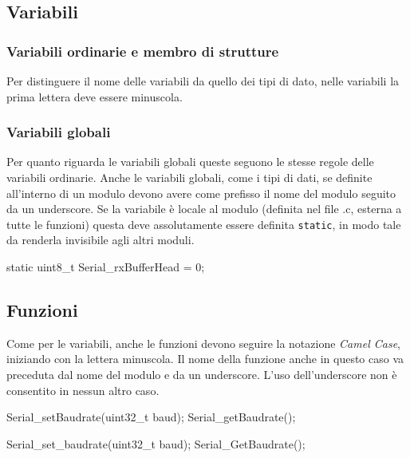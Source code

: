\subsection{Variabili}\label{ssec:evariable}

\subsubsection{Variabili ordinarie e membro di strutture}\label{sssec:evarnorm}

Per distinguere il nome delle variabili da quello dei tipi di dato, nelle variabili la prima lettera deve essere minuscola.

\subsubsection{Variabili globali}

Per quanto riguarda le variabili globali queste seguono le stesse regole delle variabili ordinarie.
Anche le variabili globali, come i tipi di dati, se definite all'interno di un modulo devono avere come prefisso il nome del modulo seguito da un underscore.
Se la variabile è locale al modulo (definita nel file .c, esterna a tutte le funzioni) questa deve assolutamente essere definita \texttt{static}, in modo tale da renderla invisibile agli altri moduli.

\noindent\begin{minipage}[t]{\rbwidth}
\begin{RightCode}
static uint8_t Serial_rxBufferHead = 0;
\end{RightCode}
\end{minipage}

\subsection{Funzioni}

Come per le variabili, anche le funzioni devono seguire la notazione \emph{Camel Case}, iniziando con la lettera minuscola\cite{codestyle:geotechnical}.
Il nome della funzione anche in questo caso va preceduta dal nome del modulo e da un underscore.
L'uso dell'underscore non è consentito in nessun altro caso.

\noindent\begin{minipage}[t]{\cbwidth}
\begin{RightCode}
Serial_setBaudrate(uint32_t baud);
Serial_getBaudrate();
\end{RightCode}
\end{minipage}%
\hspace{\cbdistance}
\begin{minipage}[t]{\cbwidth}
\begin{ErrorCode}
Serial_set_baudrate(uint32_t baud);
Serial_GetBaudrate();
\end{ErrorCode}
\end{minipage}

